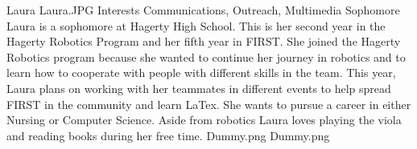 \insertbio
{Laura}
{Laura.JPG}
{Interests}
{Communications, Outreach, Multimedia}
{Sophomore}
{
Laura is a sophomore at Hagerty High School. This is her second year in the Hagerty Robotics Program and her fifth year in FIRST. She joined the Hagerty Robotics program because she wanted to continue her journey in robotics and to learn how to cooperate with people with different skills in the team. This year, Laura plans on working with her teammates in different events to help spread FIRST in the community and learn LaTex. She wants to pursue a career in either Nursing or Computer Science. Aside from robotics Laura loves playing the viola and reading books during her free time.
}
{Dummy.png}
{Dummy.png}
